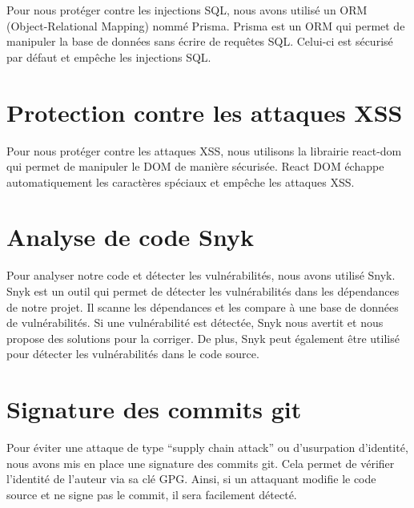 \documentclass[
  11pt,
  paper=a4,
  ,captions=tableheading
]{scrartcl}
\begin{document}
Pour nous protéger contre les injections SQL, nous avons utilisé un ORM
(Object-Relational Mapping) nommé Prisma. Prisma est un ORM qui permet
de manipuler la base de données sans écrire de requêtes SQL. Celui-ci
est sécurisé par défaut et empêche les injections SQL.

\hypertarget{protection-contre-les-attaques-xss}{%
\section{Protection contre les attaques
XSS}\label{protection-contre-les-attaques-xss}}

Pour nous protéger contre les attaques XSS, nous utilisons la librairie
react-dom qui permet de manipuler le DOM de manière sécurisée. React DOM
échappe automatiquement les caractères spéciaux et empêche les attaques
XSS.

\hypertarget{analyse-de-code-snyk}{%
\section{Analyse de code Snyk}\label{analyse-de-code-snyk}}

Pour analyser notre code et détecter les vulnérabilités, nous avons
utilisé Snyk. Snyk est un outil qui permet de détecter les
vulnérabilités dans les dépendances de notre projet. Il scanne les
dépendances et les compare à une base de données de vulnérabilités. Si
une vulnérabilité est détectée, Snyk nous avertit et nous propose des
solutions pour la corriger. De plus, Snyk peut également être utilisé
pour détecter les vulnérabilités dans le code source.

\hypertarget{signature-des-commits-git}{%
\section{Signature des commits git}\label{signature-des-commits-git}}

Pour éviter une attaque de type “supply chain attack” ou d’usurpation
d’identité, nous avons mis en place une signature des commits git. Cela
permet de vérifier l’identité de l’auteur via sa clé GPG. Ainsi, si un
attaquant modifie le code source et ne signe pas le commit, il sera
facilement détecté.
\end{document}
